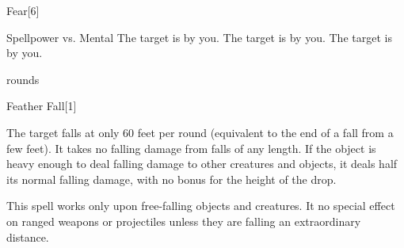 \begin{spellsection}[Mass]{Fear}[6]
    \begin{spellheader}
    \end{spellheader}
    \begin{spellcontent}
        \begin{spelltargetinginfo}
        \end{spelltargetinginfo}
        \begin{spelleffects}
            \begin{spellattack}{Spellpower vs. Mental}
                \spellsuccess The target is \frightened by you.
                \spellcritical The target is \panicked by you.
                \spellfailure The target is \shaken by you.
            \end{spellattack}
             rounds
        \end{spelleffects}
    \end{spellcontent}
    \begin{spellfooter}
        \miscastexplode
    \end{spellfooter}
\end{spellsection}

\begin{spellsection}{Feather Fall}[1]
    \begin{spellheader}
    \end{spellheader}
    \begin{spellcontent}
        \begin{spelltargetinginfo}
        \end{spelltargetinginfo}
        \begin{spelleffects}
            \spelleffect The target falls at only 60 feet per round (equivalent to the end of a fall from a few feet). It takes no falling damage from falls of any length. If the object is heavy enough to deal falling damage to other creatures and objects, it deals half its normal falling damage, with no bonus for the height of the drop.
            \spelldur \durshort
        \end{spelleffects}
    \end{spellcontent}
    \begin{spellfooter}
        \spellnotes This spell works only upon free-falling objects and creatures. It no special effect on ranged weapons or projectiles unless they are falling an extraordinary distance.
        \miscastrandom
    \end{spellfooter}
\end{spellsection}

